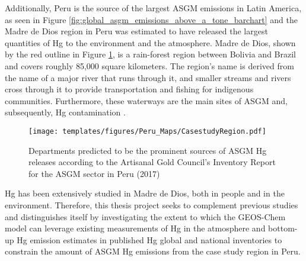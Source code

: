 \begin{flushleft}
Additionally, Peru is the source of the largest ASGM emissions in Latin America, as seen in Figure \ref{fig:global_asgm_emissions_above_a_tone_barchart} and the Madre de Dios region in Peru was estimated to have released the largest quantities of Hg to the environment and the atmosphere\cite{agc_reporte_2017}. Madre de Dios, shown by the red outline in Figure \ref{fig:PeruCS}, is a rain-forest region between Bolivia and Brazil and covers roughly 85,000 square kilometers. The region's name is derived from the name of a major river that runs through it, and smaller streams and rivers cross through it to provide transportation and fishing for indigenous communities. Furthermore, these waterways are the main sites of ASGM and, subsequently, Hg contamination \cite{ashe_elevated_2012,agc_reporte_2017}. 
\begin{figure}[H]
  \texttt{[image: templates/figures/Peru\_Maps/CasestudyRegion.pdf]}
  \centering
  \caption{Departments predicted to be the prominent sources of ASGM Hg releases according to the Artisanal Gold Council's  Inventory Report for the ASGM sector in Peru (2017) }
  \label{fig:PeruCS}
\end{figure}
\FloatBarrier

Hg has been extensively studied in Madre de Dios, both in people and in the environment. Therefore, this thesis project seeks to complement previous studies and distinguishes itself  by investigating the extent to which the GEOS-Chem model can leverage existing measurements of Hg in the atmosphere and bottom-up Hg emission estimates in published Hg global and national inventories to constrain the amount of ASGM Hg emissions from the case study region in Peru. 

\end{flushleft}
